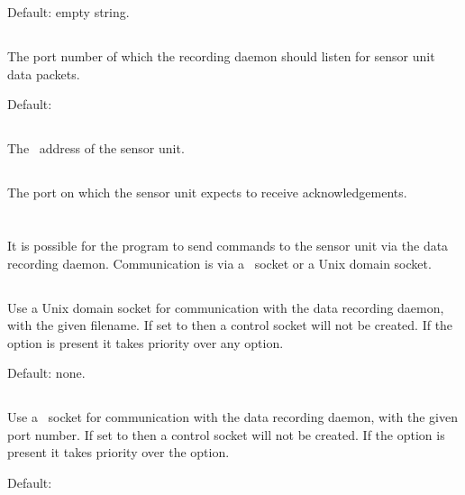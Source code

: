 {  Default: empty string.

  \subsection{}
  The port number of which the recording daemon should listen for sensor unit
  data packets.

  Default: 

  \subsection{}
  The \ip\ address of the sensor unit.

  \subsection{}
  The port on which the sensor unit expects to receive acknowledgements.
}{}


\section{\code{[controlsocket]}}

It is possible for the  program to send commands
to the sensor unit via the data recording daemon. Communication is
via a \udp\ socket or a Unix domain socket.

\subsection{}
Use a Unix domain socket for communication with the data recording
daemon, with the given filename. If set to  then a
control socket will not be created. If the  option is
present it takes priority over any  option.

Default: none.

\subsection{}
Use a \udp\ socket for communication with the data recording
daemon, with the given port number. If set to  then a
control socket will not be created. If the  option is
present it takes priority over the  option.

Default: 


